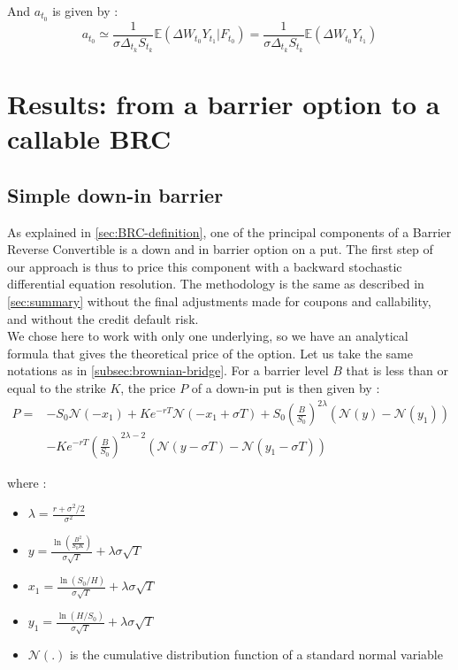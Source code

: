 \documentclass[a4paper,11pt,english]{book}
\begin{document}
And $a_{t_0}$ is given by :
$$a_{t_0} \simeq \frac{1}{\sigma \Delta_{t_k} S_{t_k}}\mathbb{E}(\Delta W_{t_0} Y_{t_{1}}|F_{t_0})=\frac{1}{\sigma \Delta_{t_k} S_{t_k}}\mathbb{E}(\Delta W_{t_0} Y_{t_{1}})$$



\chapter{Results: from a barrier option to a callable BRC}

\section{Simple down-in barrier}
As explained in \ref{sec:BRC-definition}, one of the principal components of a Barrier Reverse Convertible is a down and in barrier option on a put. The first step of our approach is thus to price this component with a backward stochastic differential equation resolution. The methodology is the same as described in \ref{sec:summary} without the final adjustments made for coupons and callability, and without the credit default risk.\\

We chose here to work with only one underlying, so we have an analytical formula that gives the theoretical price of the option. Let us take the same notations as in \ref{subsec:brownian-bridge}. For a barrier level $B$ that is less than or equal to the strike $K$, the price $P$ of a down-in put is then given by \cite{hull2016options}: 
$$\begin{aligned}
P =& -S_{0}\mathcal{N}(-x_{1})+Ke^{-rT}\mathcal{N}(-x_{1}+\sigma T)+S_{0}(\frac{B}{S_{0}})^{2\lambda}(\mathcal{N}(y)-\mathcal{N}(y_{1})) \\
&-Ke^{-rT}(\frac{B}{S_{0}})^{2\lambda-2}(\mathcal{N}(y-\sigma T)-\mathcal{N}(y_{1}-\sigma T))
\end{aligned}$$

where :
\begin{itemize}
    \item $\lambda=\frac{r+\sigma^{2}/2}{\sigma^{2}}$
    \item $y=\frac{\ln(\frac{B^{2}}{S_{0}K})}{\sigma \sqrt{T}}+\lambda \sigma \sqrt{T}$
    \item $x_{1}=\frac{\ln(S_{0}/H)}{\sigma \sqrt{T}}+\lambda \sigma \sqrt{T}$
    \item $y_{1}=\frac{\ln(H/S_{0})}{\sigma \sqrt{T}}+\lambda \sigma \sqrt{T}$
    \item $\mathcal{N}(.)$ is the cumulative distribution function of a standard normal variable
\end{itemize}
\end{document}
